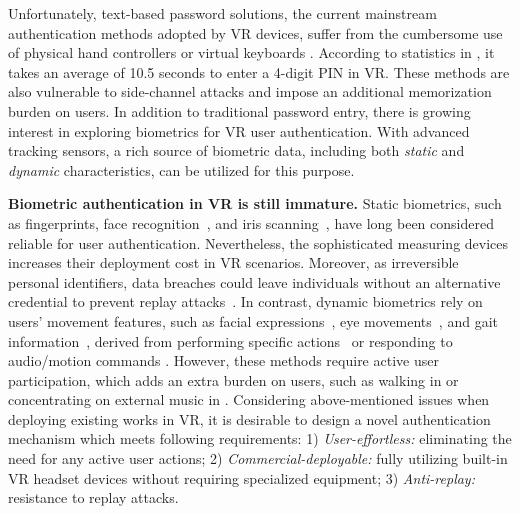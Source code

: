 \documentclass[sigconf]{acmart}
\begin{document}
Unfortunately, text-based password solutions, the current mainstream authentication methods adopted by VR devices, suffer from the cumbersome use of physical hand controllers or virtual keyboards \cite{Sok_SP,A_Literature_Review}. According to statistics in \cite{7804002}, it takes an average of 10.5 seconds to enter a 4-digit PIN in VR. These methods are also vulnerable to side-channel attacks \cite{USENIX23_HiddenReality, Ling2019IKW, Meteriz_9756766} and impose an additional memorization burden on users.
In addition to traditional password entry, there is growing interest in exploring biometrics for VR user authentication. With advanced tracking sensors, a rich source of biometric data, including both \textit{static} and \textit{dynamic} characteristics, can be utilized for this purpose.



\noindent \textbf{Biometric authentication in VR is still immature.}
Static biometrics, such as fingerprints, face recognition~\cite{FaceRecognition}, and iris scanning~\cite{Iris_BOUTROS2020104007}, have long been considered reliable for user authentication. Nevertheless, the sophisticated measuring devices increases their deployment cost in VR scenarios. Moreover, as irreversible personal identifiers, data breaches could leave individuals without an alternative credential to prevent replay attacks~\cite{Tolosana_PAD, ROBERTS200714}. 
In contrast, dynamic biometrics rely on users' movement features, such as facial expressions~\cite{FacialExpression}, eye movements~\cite{zhu2020blinkey,Zhu2023SoundLockAN}, and gait information~\cite{GaitLock}, derived from performing specific actions~\cite{Head_IWSPA18, GaitLock, BioMove, SkullConduct16} or responding to audio/motion commands \cite{Zhu2023SoundLockAN}. However, these methods require active user participation, which adds an extra burden on users, such as walking in \cite{GaitLock} or concentrating on external music in \cite{Zhu2023SoundLockAN}.
Considering above-mentioned issues when deploying existing works in VR, it is desirable to design a novel authentication mechanism which meets following requirements: 1) \textit{User-effortless:} eliminating the need for any active user actions; 2) \textit{Commercial-deployable:} fully utilizing built-in VR headset devices without requiring specialized equipment; 3) \textit{Anti-replay:} resistance to replay attacks.
\end{document}
